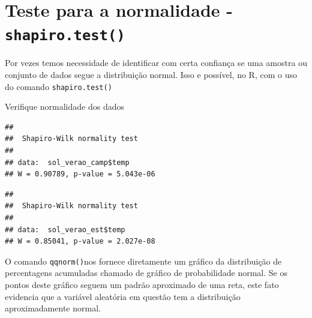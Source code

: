 \documentclass[
]{book}
\newenvironment{Shaded}{\begin{snugshade}}{\end{snugshade}}
\newcommand{\CommentTok}[1]{\textcolor[rgb]{0.56,0.35,0.01}{\textit{#1}}}
\newcommand{\KeywordTok}[1]{\textcolor[rgb]{0.13,0.29,0.53}{\textbf{#1}}}
\newcommand{\NormalTok}[1]{#1}
\newcommand{\OperatorTok}[1]{\textcolor[rgb]{0.81,0.36,0.00}{\textbf{#1}}}
\begin{document}
\hypertarget{teste-para-a-normalidade---shapiro.test}{%
\section{\texorpdfstring{Teste para a normalidade - \texttt{shapiro.test()}}{Teste para a normalidade - shapiro.test()}}\label{teste-para-a-normalidade---shapiro.test}}

Por vezes temos necessidade de identificar com certa confiança se uma amostra ou conjunto de dados segue a distribuição normal. Isso e possível, no R, com o uso do comando \texttt{shapiro.test()}

Verifique normalidade dos dados

\begin{Shaded}
\end{Shaded}

\begin{verbatim}
## 
##  Shapiro-Wilk normality test
## 
## data:  sol_verao_camp$temp
## W = 0.90789, p-value = 5.043e-06
\end{verbatim}

\begin{Shaded}
\end{Shaded}

\begin{verbatim}
## 
##  Shapiro-Wilk normality test
## 
## data:  sol_verao_est$temp
## W = 0.85041, p-value = 2.027e-08
\end{verbatim}

O comando \texttt{qqnorm()}nos fornece diretamente um gráfico da distribuição de percentagens
acumuladas chamado de gráfico de probabilidade normal. Se os pontos deste gráfico seguem um padrão aproximado de uma reta, este fato evidencia que a variável aleatória em questão tem a distribuição aproximadamente normal.

\begin{Shaded}
\end{Shaded}
\end{document}
